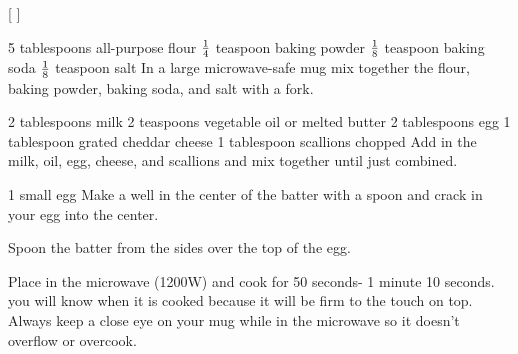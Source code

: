 
[
]

\begin{step}
5 tablespoons all-purpose flour
$\frac{1}{4}$ teaspoon baking powder
$\frac{1}{8}$ teaspoon baking soda
$\frac{1}{8}$ teaspoon salt
\method
In a large microwave-safe mug mix together the flour, baking powder, baking soda, and salt with a fork.
\end{step}

\begin{step}
2 tablespoons milk
2 teaspoons vegetable oil or melted butter
2 tablespoons egg
1 tablespoon grated cheddar cheese
1 tablespoon scallions chopped
\method
Add in the milk, oil, egg, cheese, and scallions and mix together until just combined.
\end{step}

\begin{step}
1 small egg
\method
Make a well in the center of the batter with a spoon and crack in your egg into the center.

Spoon the batter from the sides over the top of the egg.

Place in the microwave (1200W) and cook for 50 seconds- 1 minute 10 seconds. you will know when it is cooked because it will be firm to the touch on top. Always keep a close eye on your mug while in the microwave so it doesn’t overflow or overcook.
\end{step}